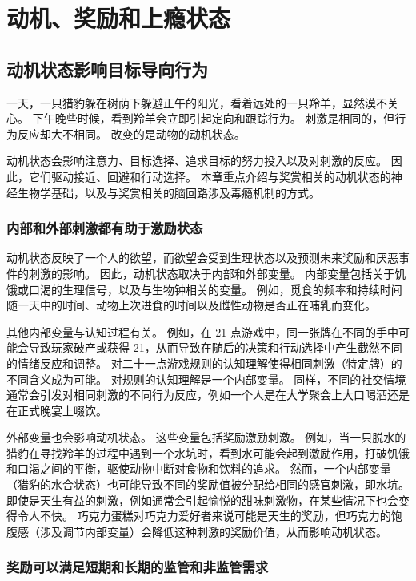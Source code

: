 \chapter{动机、奖励和上瘾状态} \label{chap:chap43}

\section{动机状态影响目标导向行为}

一天，一只猎豹躲在树荫下躲避正午的阳光，看着远处的一只羚羊，显然漠不关心。
下午晚些时候，看到羚羊会立即引起定向和跟踪行为。
刺激是相同的，但行为反应却大不相同。
改变的是动物的动机状态。


动机状态会影响注意力、目标选择、追求目标的努力投入以及对刺激的反应。
因此，它们驱动接近、回避和行动选择。
本章重点介绍与奖赏相关的动机状态的神经生物学基础，以及与奖赏相关的脑回路涉及毒瘾机制的方式。



\subsection{内部和外部刺激都有助于激励状态}

动机状态反映了一个人的欲望，而欲望会受到生理状态以及预测未来奖励和厌恶事件的刺激的影响。
因此，动机状态取决于内部和外部变量。
内部变量包括关于饥饿或口渴的生理信号，以及与生物钟相关的变量。
例如，觅食的频率和持续时间随一天中的时间、动物上次进食的时间以及雌性动物是否正在哺乳而变化。


其他内部变量与认知过程有关。
例如，在 21 点游戏中，同一张牌在不同的手中可能会导致玩家破产或获得 21，从而导致在随后的决策和行动选择中产生截然不同的情绪反应和调整。
对二十一点游戏规则的认知理解使得相同刺激（特定牌）的不同含义成为可能。
对规则的认知理解是一个内部变量。
同样，不同的社交情境通常会引发对相同刺激的不同行为反应，例如一个人是在大学聚会上大口喝酒还是在正式晚宴上啜饮。


外部变量也会影响动机状态。
这些变量包括奖励激励刺激。
例如，当一只脱水的猎豹在寻找羚羊的过程中遇到一个水坑时，看到水可能会起到激励作用，打破饥饿和口渴之间的平衡，驱使动物中断对食物和饮料的追求。
然而，一个内部变量（猎豹的水合状态）也可能导致不同的奖励值被分配给相同的感官刺激，即水坑。
即使是天生有益的刺激，例如通常会引起愉悦的甜味刺激物，在某些情况下也会变得令人不快。
巧克力蛋糕对巧克力爱好者来说可能是天生的奖励，但巧克力的饱腹感（涉及调节内部变量）会降低这种刺激的奖励价值，从而影响动机状态。



\subsection{奖励可以满足短期和长期的监管和非监管需求}

